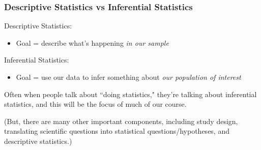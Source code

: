 \documentclass[12pt, 
hyperref={colorlinks=true, linkcolor=blue, urlcolor=cyan}]{beamer}
\begin{document}
\begin{frame}
\frametitle{Descriptive Statistics vs Inferential Statistics}

\color{blue} Descriptive Statistics: \color{black}
\begin{itemize}
\item Goal = \color{blue} describe \color{black} what's happening \color{blue} \textit{in our sample} \color{black}
\end{itemize}

\color{orange} Inferential Statistics: \color{black}
\begin{itemize}
\item Goal = use our data to \color{orange} infer \color{black} something about \color{orange} \textit{our population of interest} \color{black}
\end{itemize}

Often when people talk about ``doing statistics," they're talking about inferential statistics, and this will be the focus of much of our course. \begin{footnotesize} (But, there are many other important components, including study design, translating scientific questions into statistical questions/hypotheses, and descriptive statistics.) \end{footnotesize}

\end{frame}
\end{document}
